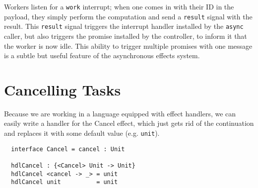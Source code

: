 \documentclass[msc,deptreport,cs]{infthesis} %
\newcommand{\code}[1]{\lstinline{#1}}
\newcommand{\greytext}[1]{\textcolor{black!40}{#1}}
\begin{document}




Workers listen for a \code{work} interrupt; when one comes in with their ID in
the payload, they simply perform the computation and send a \code{result} signal
with the result. This \code{result} signal triggers the interrupt handler
installed by the \code{async} caller, but also triggers the promise installed by
the controller, to inform it that the worker is now idle. This ability to
trigger multiple promises with one message is a subtle but useful feature of the
asynchronous effects system.

\section{Cancelling Tasks}

Because we are working in a language equipped with effect handlers, we can
easily write a handler for the \textsf{Cancel} effect, which just gets rid of
the continuation and replaces it with some default value (e.g. \code{unit}).

\begin{lstlisting}
  interface Cancel = cancel : Unit
 
  hdlCancel : {<Cancel> Unit -> Unit}
  hdlCancel <cancel -> _> = unit
  hdlCancel unit          = unit
\end{lstlisting}
\end{document}
